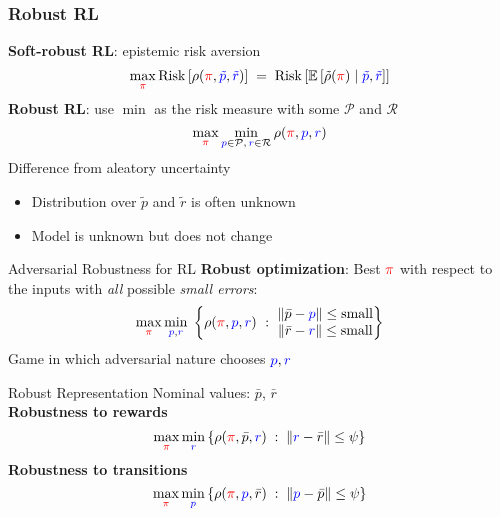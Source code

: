 \documentclass{beamer}
\newcommand{\return}{\rho}
\newcommand{\tc}[2]{\textcolor{#1}{#2}}
\newcommand{\tcb}[1]{\tc{blue}{#1}}
\newcommand{\tcr}[1]{\tc{red}{#1}}
\newcommand{\E}{\mathbb{E}}
\newcommand{\Ex}[1]{\E \left[#1 \right]}
\newcommand{\risko}{\operatorname{Risk}}
\newcommand{\risk}[1]{\risko\left[#1\right]}
\begin{document}
\begin{frame} \frametitle{Robust RL}
    \textbf{Soft-robust RL}: epistemic risk aversion
    \[
      \max_{\tcr\pi} \risk{\rho(\tcr\pi, \tcb{ \tilde{p} }, \tcb{ \tilde{r} })}
      \; =\;
        \risk{ \Ex{\tilde{\rho}(\tcr\pi) \mid \tcb{ \tilde{p} }, \tcb{ \tilde{r} }} }
    \]
    \vfill 
    \textbf{Robust RL}: use $\min$ as the risk measure with some $\mathcal{P}$ and $\mathcal{R}$
    \[
      \max_{\tcr\pi} \min_{\tcb{p}\in \mathcal{P},\, \tcb{r}\in \mathcal{R}} \rho(\tcr\pi, \tcb{ p }, \tcb{ r })
    \]
    \vfill
    Difference from aleatory uncertainty
    \begin{itemize}
    \item Distribution over $\tilde{p}$ and $\tilde{r}$ is often unknown
    \item Model is unknown but does not change
    \end{itemize}
\end{frame}

\begin{frame}{Adversarial Robustness for RL}
    \textbf{Robust optimization}: Best $\tcr{\pi}$ with respect to the inputs with \emph{all} possible \emph{small errors}: 
    \[ \max_{\tcr{\pi}} \min_{\tcb{p}, \tcb{r}} \; \left\{ \return(\tcr{\pi}, \tcb{p}, \tcb{r}) ~:~ 
    \begin{matrix} 
    \lVert \bar{p} - \tcb{p} \rVert \le \text{small} \\ 
    \lVert \bar{r} - \tcb{r} \rVert \le \text{small}
    \end{matrix} \right\} \]
    {\small Game in which adversarial nature chooses $\tcb{p}, \tcb{r}$}
\end{frame}


\begin{frame}{Robust Representation}
	Nominal values: $\bar{p}$, $\bar{r}$\\
	\vfill
	\textbf{Robustness to rewards}
		\[ \max_{\tcr{\pi}} \min_{\tcb{r}} \left\{ \return(\tcr{\pi}, \bar{p}, \tcb{r}) \;:\; \|\tcb{r} - \bar{r}\| \le \psi \right\} \]
	\vfill
	\textbf{Robustness to transitions}
		\[ \max_{\tcr{\pi}} \min_{\tcb{p}} \left\{ \return(\tcr{\pi}, \tcb{p}, \bar{r}) \;:\; \|\tcb{p} - \bar{p}\| \le \psi \right\} \]
	\vfill
\end{frame}
\end{document}
